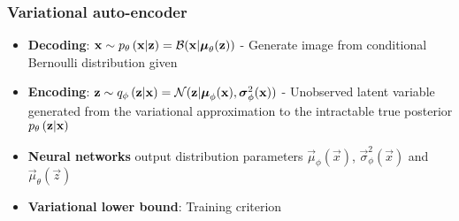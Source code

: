\subsubsection{Variational auto-encoder} %
\label{ssub:variational_auto_encoder}
\begin{itemize}
	\item \textbf{Decoding}: $\bm{\mathrm{x}} \sim p_{\theta}\left(\bm{\mathrm{x}}|\bm{\mathrm{z}}\right)=\mathcal{B}( \bm{\mathrm{x}}|\bm{\mathrm{\mu}}_\theta(\bm{\mathrm{z}}))$ - Generate image from conditional Bernoulli distribution given
	\item \textbf{Encoding}: $\bm{\mathrm{z}} \sim q_{\phi}\left(\bm{\mathrm{z}}|\bm{\mathrm{x}}\right)=\mathcal{N}( \bm{\mathrm{z}}|\bm{\mathrm{\mu}}_\phi(\bm{\mathrm{x}}),\bm{\mathrm{\sigma}}^2_\phi(\bm{\mathrm{x}}))$ - Unobserved latent variable generated from the variational approximation to the intractable true posterior $p_{\theta}\left(\bm{\mathrm{z}}|\bm{\mathrm{x}}\right)$
	\item \textbf{Neural networks} output distribution parameters $\vec{\mu}_\phi(\vec{x})$, $\vec{\sigma}^2_\phi(\vec{x})$ and $\vec{\mu}_\theta(\vec{z})$
	\item \textbf{Variational lower bound}: Training criterion 

\end{itemize}
